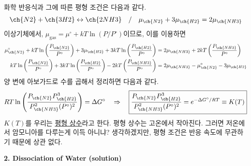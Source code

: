 \documentclass{article}
\begin{document}
화학 반응식과 그에 따른 평형 조건은 다음과 같다.
\begin{equation}
    \ch{N2} + \ch{3 H2} \leftrightarrow \ch{2 NH3} \quad / \quad \mu_{\ch{N2}} + 3\mu_{\ch{H2}} = 2\mu_{\ch{NH3}}
\end{equation}
이상기체에서, $\mu_\text{gas} = \mu^\circ + kT \ln (P/P^\circ)$이므로, 이를 이용하면
\begin{align}
    \mu_{\ch{N2}}^\circ + kT \ln \left( \frac{P_{\ch{N2}}}{P^\circ} \right) + 3\mu_{\ch{H2}} + 3kT \ln \left( \frac{P_{\ch{H2}}}{P^\circ} \right) &= 2\mu_{\ch{NH3}} + 2 kT \left( \frac{P_{\ch{NH3}}}{P^\circ} \right)\\
    kT \ln \left( \frac{P_{\ch{N2}}}{P^\circ} \right) + 3kT \ln \left( \frac{P_{\ch{H2}}}{P^\circ} \right) -2 kT \left( \frac{P_{\ch{NH3}}}{P^\circ} \right) &= 2\mu_{\ch{NH3}} -\mu_{\ch{N2}}^\circ -3\mu_{\ch{H2}}
\end{align}
양 변에 아보가드로 수를 곱해서 정리하면 다음과 같다.
\begin{equation}
    RT \ln \left( \frac{P_{\ch{N2}} P_{\ch{H2}}^3}{P_{\ch{NH3}}^2 (P^\circ)^2} \right) = \Delta G^\circ \quad \Rightarrow \quad \boxed{\frac{P_{\ch{N2}} P_{\ch{H2}}^3}{P_{\ch{NH3}}^2 (P^\circ)^2} = e^{-\Delta G^\circ /RT} \equiv K(T)}
\end{equation}
$K(T)$를 우리는 \underline{평형 상수}라고 한다. 평형 상수는 고온에서 작아진다. 그러면 저온에서 암모니아를 다루는게 이득 아니냐? 생각하겠지만, 평형 조건은 반응 속도에 무관하기 때문에 상관 없다.

\vspace{3mm}\noindent
\textbf{2. Dissociation of Water (solution)}
\end{document}
